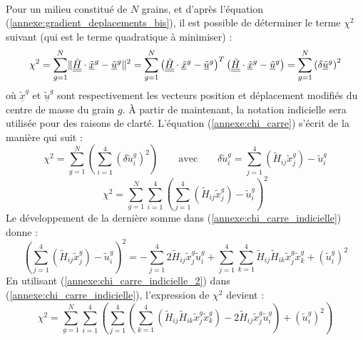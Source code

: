 \\Pour un milieu constitué de $N$ grains, et d'après l'équation (\ref{annexe:gradient_deplacements_bis}), il est possible de déterminer le terme $\chi^2$ suivant (qui est le terme quadratique à minimiser) :
\begin{equation}\label{annexe:chi_carre}
\chi^2
= \sum_{g=1}^{N} \lVert \underline{\underline{\tilde{H}}} \cdot \underline{\tilde{x}}^g - \underline{\tilde{u}}^g \rVert^2
= \sum_{g=1}^{N} \left( \underline{\underline{\tilde{H}}} \cdot \underline{\tilde{x}}^g - \underline{\tilde{u}}^g \right)^T \left( \underline{\underline{\tilde{H}}} \cdot \underline{\tilde{x}}^g - \underline{\tilde{u}}^g \right)
= \sum_{g=1}^{N} \left( \delta\underline{\tilde{u}}^g \right)^2
\end{equation}
où $\underline{\tilde{x}}^g$ et $\underline{\tilde{u}}^g$ sont respectivement les vecteurs position et déplacement modifiés du centre de masse du grain $g$. \`A partir de maintenant, la notation indicielle sera utilisée pour des raisons de clarté. L'équation (\ref{annexe:chi_carre}) s'écrit de la manière qui suit :
\begin{equation*}
\chi^2
= \sum_{g=1}^{N} \left( \sum_{i=1}^{4} \left( \delta \tilde{u}_i^g \right)^2 \right)
\qquad\textrm{avec}\qquad
\delta \tilde{u}_i^g =
\sum_{j=1}^{4} \left( \tilde{H}_{ij}\tilde{x}_j^g \right) - \tilde{u}_i^g
\end{equation*}
\begin{equation}\label{annexe:chi_carre_indicielle}
\chi^2
= \sum_{g=1}^{N} \sum_{i=1}^{4} \left( \sum_{j=1}^{4} \left( \tilde{H}_{ij}\tilde{x}_j^g \right) - \tilde{u}_i^g \right)^2
\end{equation}
Le développement de la dernière somme dans (\ref{annexe:chi_carre_indicielle}) donne :
\begin{equation}\label{annexe:chi_carre_indicielle_2}
\left( \sum_{j=1}^{4} \left( \tilde{H}_{ij}\tilde{x}_j^g \right) - \tilde{u}_i^g \right)^2
= -\sum_{j=1}^{4} 2\tilde{H}_{ij}\tilde{x}_j^g\tilde{u}_i^g + \sum_{j=1}^{4} \sum_{k=1}^{4} \tilde{H}_{ij}\tilde{H}_{ik}\tilde{x}_j^g\tilde{x}_k^g + (\tilde{u}_i^g)^2
\end{equation}
En utilisant (\ref{annexe:chi_carre_indicielle_2}) dans (\ref{annexe:chi_carre_indicielle}), l'expression de $\chi^2$ devient :
\begin{equation}\label{annexe:chi_carre_indicielle_3}
\chi^2
= \sum_{g=1}^{N} \sum_{i=1}^{4} \left( \sum_{j=1}^{4} \left( \sum_{k=1}^{4} \left( \tilde{H}_{ij}\tilde{H}_{ik}\tilde{x}_j^g\tilde{x}_k^g \right) - 2\tilde{H}_{ij}\tilde{x}_j^g\tilde{u}_i^g \right) + (\tilde{u}_i^g)^2 \right)
\end{equation}
